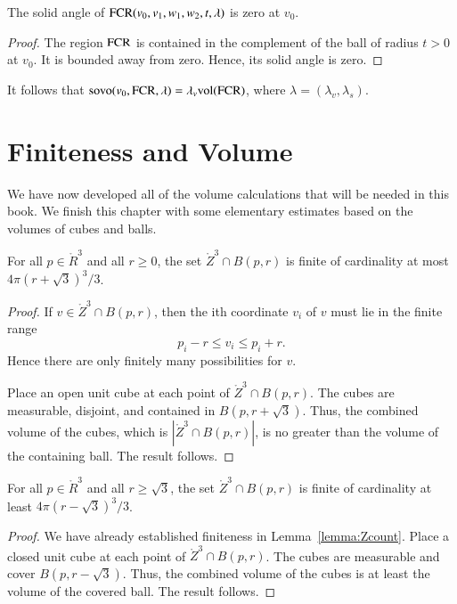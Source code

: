 \begin{lemma}  The solid angle of ${\operatorname{FCR}}(v_0,v_1,w_1,w_2,t,\lambda)$
is zero at $v_0$.
\end{lemma}

\begin{proof}  The region ${\operatorname{FCR}}$ is contained in the complement
of the ball of radius $t>0$ at $v_0$.  It is bounded away from
zero.  Hence, its solid angle is zero.
\end{proof}

It follows that ${\operatorname{sovo}}(v_0,{\operatorname{FCR}},\lambda) = \lambda_v{\operatorname{vol}}({\operatorname{FCR}})$,
where $\lambda=(\lambda_v,\lambda_s)$.



\section{Finiteness and Volume}

We have now developed all of the volume calculations that will
be needed in this book.   We finish this chapter with some 
elementary estimates based on the volumes of  cubes and balls.

\begin{lemma}
    For all $p\in\ring{R}^3$ and all $r\ge 0$, the set
    $\ring{Z}^3\cap B(p,r)$ is finite of cardinality at most
    $4\pi (r+\sqrt3)^3/3$.
\end{lemma}

\begin{proof}  If $v\in\ring{Z}^3\cap B(p,r)$, then the ith
coordinate $v_i$ of $v$ must lie in the finite range
    $$
    p_i - r \le v_i \le p_i + r.
    $$
Hence there are only finitely many possibilities for $v$.


Place an open unit cube at each point of $\ring{Z}^3\cap B(p,r)$.
The cubes are measurable, disjoint, and contained in
$B(p,r+\sqrt3)$.  Thus, the combined volume of the cubes, which is
$|\ring{Z}^3\cap B(p,r)|$,  is no greater than the volume of the
containing ball.  The result follows.
\end{proof}

\begin{lemma}
  For all $p\in\ring{R}^3$ and all $r\ge\sqrt3$, the set
    $\ring{Z}^3\cap B(p,r)$ is finite of cardinality at least
    $4\pi (r-\sqrt3)^3/3$.
\end{lemma}

\begin{proof} We have already established finiteness in
Lemma~\ref{lemma:Zcount}.  Place a closed unit cube at each point
of $\ring{Z}^3\cap B(p,r)$.  The cubes are measurable and cover
$B(p,r-\sqrt3)$.  Thus, the combined volume of the cubes is at
least the volume of the covered ball.  The result follows.
\end{proof}

